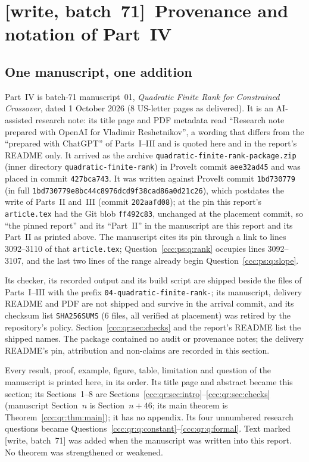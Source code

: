 \documentclass[11pt,letterpaper]{article}
\theoremstyle{definition}
\theoremstyle{remark}
\newcommand{\wsevone}{\textup{[write, batch~71]}}
\begin{document}
\section{\texorpdfstring{\wsevone\ }{}Provenance and notation of Part~IV}
\label{ccc:qr:sec:provenance}

\subsection{One manuscript, one addition}\label{ccc:qr:sec:source}

Part~IV is batch-71 manuscript~01, \emph{Quadratic Finite Rank for
Constrained Crossover}, dated 1 October 2026 (8 US-letter pages as
delivered). It is an AI-assisted research note: its title page and PDF
metadata read ``Research note prepared with OpenAI for Vladimir
Reshetnikov'', a wording that differs from the ``prepared with ChatGPT'' of
Parts~I--III and is quoted here and in the report's README only. It arrived
as the archive \texttt{quadratic-finite-rank-package.zip} (inner directory
\texttt{quadratic-finite-rank}) in ProveIt commit \texttt{aee32ad45} and was
placed in commit \texttt{427bca743}. It was written against ProveIt commit
\texttt{1bd730779} (in full
\nolinkurl{1bd730779e8bc44c8976dcd9f38cad86a0d21c26}), which postdates the
write of Parts~II and~III (commit \texttt{202aafd08}); at the pin this
report's \texttt{article.tex} had the Git blob \texttt{ff492c83}, unchanged
at the placement commit, so ``the pinned report'' and its ``Part~II'' in the
manuscript are this report and its Part~II as printed above. The
manuscript cites its pin through a link to lines 3092--3110 of that
\texttt{article.tex}; Question~\ref{ccc:ps:q:rank} occupies lines 3092--3107,
and the last two lines of the range already begin
Question~\ref{ccc:ps:q:slope}.

Its checker, its recorded output and its build script are shipped beside the
files of Parts~I--III with the prefix \nolinkurl{04-quadratic-finite-rank-};
its manuscript, delivery README and PDF are not shipped and survive in the
arrival commit, and its checksum list \texttt{SHA256SUMS} (6 files, all
verified at placement) was retired by the repository's policy.
Section~\ref{ccc:qr:sec:checks} and the report's README list the shipped
names. The package contained no audit or provenance notes; the delivery
README's pin, attribution and non-claims are recorded in this section.

Every result, proof, example, figure, table, limitation and question of the
manuscript is printed here, in its order. Its title page and abstract became
this section; its Sections~1--8 are
Sections~\ref{ccc:qr:sec:intro}--\ref{ccc:qr:sec:checks} (manuscript
Section~$n$ is Section~$n+46$; its main theorem is
Theorem~\ref{ccc:qr:thm:main}); it has no appendix. Its four unnumbered
research questions became Questions~\ref{ccc:qr:q:constant}--\ref{ccc:qr:q:formal}.
Text marked \wsevone{} was added when the manuscript was written into this
report. No theorem was strengthened or weakened.
\end{document}
